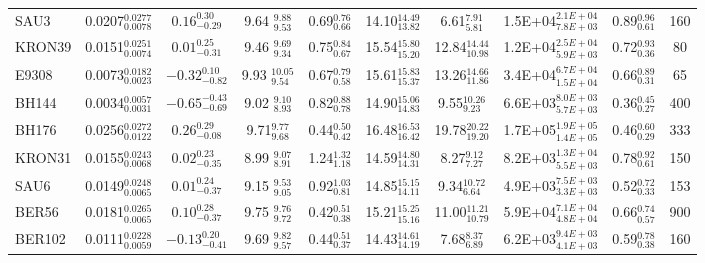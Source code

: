 \documentclass[draft]{aa}
\begin{document}
\begin{table}
\begin{tabular}{lccccccccc}
  SAU3 & 0.0207$_{0.0078}^{0.0277}$ & $0.16_{-0.29}^{0.30}$ & 9.64 $_{9.53}^{9.88 }$ & 0.69$_{0.66}^{0.76}$ &
  14.10$_{13.82}^{14.49}$ & 6.61$_{5.81}^{7.91}$ & 1.5E+04$_{7.8E+03}^{2.1E+04}$ & 0.89$_{0.61}^{0.96}$ &
  160 \\[.2cm]
  KRON39 & 0.0151$_{0.0074}^{0.0251}$ & $0.01_{-0.31}^{0.25}$ & 9.46 $_{9.34}^{9.69 }$ & 0.75$_{0.67}^{0.84}$ &
  15.54$_{15.20}^{15.80}$ & 12.84$_{10.98}^{14.44}$ & 1.2E+04$_{5.9E+03}^{2.5E+04}$ & 0.72$_{0.36}^{0.93}$ &
  80 \\[.2cm]
  E9308 & 0.0073$_{0.0023}^{0.0182}$ & $-0.32_{-0.82}^{0.10}$ & 9.93 $_{9.54}^{10.05}$ & 0.67$_{0.58}^{0.79}$ &
  15.61$_{15.37}^{15.83}$ & 13.26$_{11.86}^{14.66}$ & 3.4E+04$_{1.5E+04}^{6.7E+04}$ & 0.66$_{0.31}^{0.89}$ &
  65 \\[.2cm]
  BH144 & 0.0034$_{0.0031}^{0.0057}$ & $-0.65_{-0.69}^{-0.43}$ & 9.02 $_{8.93}^{9.10 }$ & 0.82$_{0.78}^{0.88}$ &
  14.90$_{14.83}^{15.06}$ & 9.55$_{9.23}^{10.26}$ & 6.6E+03$_{5.7E+03}^{8.0E+03}$ & 0.36$_{0.27}^{0.45}$ &
  400 \\[.2cm]
  BH176 & 0.0256$_{0.0122}^{0.0272}$ & $0.26_{-0.08}^{0.29}$ & 9.71$_{9.68}^{9.77}$ & 0.44$_{0.42}^{0.50}$ &
  16.48$_{16.42}^{16.53}$ & 19.78$_{19.20}^{20.22}$ & 1.7E+05$_{1.4E+05}^{1.9E+05}$ & 0.46$_{0.29}^{0.60}$ &
  333 \\[.2cm]
  KRON31 & 0.0155$_{0.0068}^{0.0243}$ & $0.02_{-0.35}^{0.23}$ & 8.99 $_{8.91}^{9.07 }$ & 1.24$_{1.18}^{1.32}$ &
  14.59$_{14.31}^{14.80}$ & 8.27$_{7.27}^{9.12}$ & 8.2E+03$_{5.5E+03}^{1.3E+04}$ & 0.78$_{0.61}^{0.92}$ &
  150 \\[.2cm]
  SAU6 & 0.0149$_{0.0065}^{0.0248}$ & $0.01_{-0.37}^{0.24}$ & 9.15 $_{9.05}^{9.53 }$ & 0.92$_{0.81}^{1.03}$ &
  14.85$_{14.11}^{15.15}$ & 9.34$_{6.64}^{10.72}$ & 4.9E+03$_{3.3E+03}^{7.5E+03}$ & 0.52$_{0.33}^{0.72}$ &
  153 \\[.2cm]
  BER56 & 0.0181$_{0.0065}^{0.0265}$ & $0.10_{-0.37}^{0.28}$ & 9.75 $_{9.72}^{9.76 }$ & 0.42$_{0.38}^{0.51}$ &
  15.21$_{15.16}^{15.25}$ & 11.00$_{10.79}^{11.21}$ & 5.9E+04$_{4.8E+04}^{7.1E+04}$ & 0.66$_{0.57}^{0.74}$ &
  900 \\[.2cm]
  BER102 & 0.0111$_{0.0059}^{0.0228}$ & $-0.13_{-0.41}^{0.20}$ & 9.69 $_{9.57}^{9.82 }$ & 0.44$_{0.37}^{0.51}$ &
  14.43$_{14.19}^{14.61}$ & 7.68$_{6.89}^{8.37}$ & 6.2E+03$_{4.1E+03}^{9.4E+03}$ & 0.59$_{0.38}^{0.78}$ &
  160 \\[.2cm]
  \hline
  \end{tabular}
  \end{table}
\end{document}
